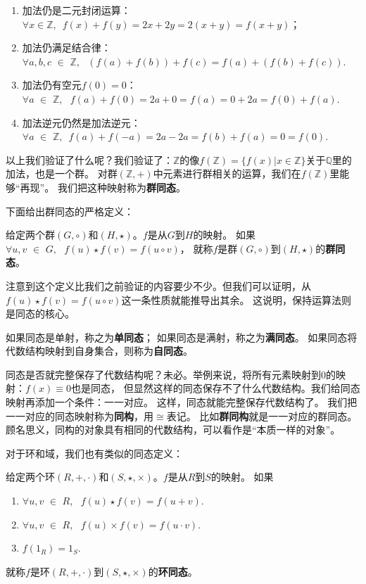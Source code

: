 \documentclass[12pt,UTF8]{ctexbook}
\begin{document}
\begin{appendix}
\begin{enumerate}
    \item 加法仍是二元封闭运算：$\forall x \in \mathbb{Z}, \,\,\, f(x) + f(y) = 2x + 2y = 2(x+y) = f(x+y)$；
    \item 加法仍满足结合律：$\forall a, b, c\,\, \in\,\, \mathbb{Z}, \,\,\,\, (f(a) +  f(b)) + f(c) = f(a) + (f(b)+ f(c)).$
    \item 加法仍有空元$f(0) = 0$：$\forall a \,\, \in \,\, \mathbb{Z}, \,\,\,\, f(a) + f(0) = 2a + 0 = f(a)  = 0 + 2a = f(0) + f(a). $
    \item 加法逆元仍然是加法逆元：$\forall a \,\, \in \,\, \mathbb{Z}, \,\,\, f(a) + f(-a) = 2a - 2a = f(b) + f(a) = 0 = f(0).$
\end{enumerate}

以上我们验证了什么呢？我们验证了：$\mathbb{Z}$的像$f(\mathbb{Z}) = \{f(x) | x \in \mathbb{Z}\}$关于$\mathbb{Q}$里的加法，也是一个群。
对群$\left(\mathbb{Z},+\right)$中元素进行群相关的运算，我们在$f(\mathbb{Z})$里能够“再现”。
我们把这种映射称为\textbf{群同态}。

下面给出群同态的严格定义：
\begin{df}\label{df:0_5}
    给定两个群$(G,\circ)$和$(H,\star)$。$f$是从$G$到$H$的映射。
    如果$\forall u, v \,\, \in \,\, G, \,\,\,\, f(u) \star f(v) = f(u\circ v)$，
    就称$f$是群$(G,\circ)$到$(H,\star)$的\textbf{群同态}。
\end{df}

注意到这个定义比我们之前验证的内容要少不少。但我们可以证明，从$ f(u) \star f(v) = f(u\circ v)$这一条性质就能推导出其余。
这说明，保持运算法则是同态的核心。

如果同态是单射，称之为\textbf{单同态}；
如果同态是满射，称之为\textbf{满同态}。
如果同态将代数结构映射到自身集合，则称为\textbf{自同态}。

同态是否就完整保存了代数结构呢？未必。举例来说，将所有元素映射到0的映射：$f(x) \equiv 0$也是同态，
但显然这样的同态保存不了什么代数结构。我们给同态映射再添加一个条件：一一对应。
这样，同态就能完整保存代数结构了。
我们把一一对应的同态映射称为\textbf{同构}，用$\cong$表记。
比如\textbf{群同构}就是一一对应的群同态。
顾名思义，同构的对象具有相同的代数结构，可以看作是“本质一样的对象”。

对于环和域，我们也有类似的同态定义：
\begin{df}\label{df:0_5_2}
    给定两个环$(R, +, \cdot )$和$(S, \star , \times)$。$f$是从$R$到$S$的映射。
    如果
    \begin{enumerate}
        \item $\forall u, v \,\, \in \,\, R, \,\,\,\, f(u) \star f(v) = f(u + v).$
        \item $\forall u, v \,\, \in \,\, R, \,\,\,\, f(u) \times f(v) = f(u \cdot v).$
        \item $f(1_R) = 1_S.$
    \end{enumerate}
    就称$f$是环$(R, +, \cdot )$到$(S, \star , \times)$的\textbf{环同态}。
\end{df}


\end{appendix}
\end{document}
